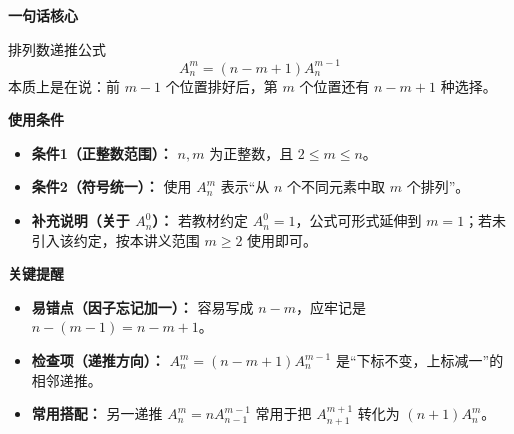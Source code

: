 \begin{summarybox}
\textbf{\textcolor{CSummary}{一句话核心}}

排列数递推公式
\[
A_n^m=(n-m+1)A_n^{m-1}
\]
本质上是在说：前 $m-1$ 个位置排好后，第 $m$ 个位置还有 $n-m+1$ 种选择。

\medskip
\textbf{\textcolor{CSummary}{使用条件}}
\begin{itemize}[leftmargin=*, itemsep=0.5em, topsep=0.4em]
    \item \textbf{条件1（正整数范围）：} $n,m$ 为正整数，且 $2\le m\le n$。
    \item \textbf{条件2（符号统一）：} 使用 $A_n^m$ 表示“从 $n$ 个不同元素中取 $m$ 个排列”。
    \item \textbf{补充说明（关于 $A_n^0$）：} 若教材约定 $A_n^0=1$，公式可形式延伸到 $m=1$；若未引入该约定，按本讲义范围 $m\ge2$ 使用即可。
\end{itemize}

\medskip
\textbf{\textcolor{CSummary}{关键提醒}}
\begin{itemize}[leftmargin=*, itemsep=0.5em, topsep=0.4em]
    \item \textbf{易错点（因子忘记加一）：} 容易写成 $n-m$，应牢记是 $n-(m-1)=n-m+1$。
    \item \textbf{检查项（递推方向）：} $A_n^m=(n-m+1)A_n^{m-1}$ 是“下标不变，上标减一”的相邻递推。
    \item \textbf{常用搭配：} 另一递推 $A_n^m=nA_{n-1}^{m-1}$ 常用于把 $A_{n+1}^{m+1}$ 转化为 $(n+1)A_n^m$。
\end{itemize}
\end{summarybox}
